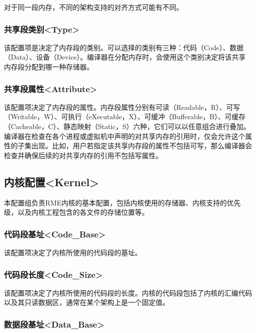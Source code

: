 对于同一段内存，不同的架构支持的对齐方式可能有不同。

\subsubsection{共享段类别<Type>{}}\label{subsubsec:5-3-11-5}

该配置项是决定了内存段的类别。可以选择的类别有三种：代码（Code）、数据（Data）、设备（Device）。编译器在分配内存时，会使用这个类别决定将该共享内存段分配到哪一种存储器。

\subsubsection{共享段属性<Attribute>{}}\label{subsubsec:5-3-11-6}

该配置项决定了内存段的属性。内存段属性分别有可读（Readable，R）、可写（Writable，W）、可执行（eXecutable，X）、可缓冲（Bufferable，B）、可缓存（Cacheable，C）、静态映射（Static，S）六种，它们可以以任意组合进行叠加。编译器在检查在各个进程或虚拟机中声明的对共享内存的引用时，仅会允许这个属性的子集出现。比如，用户若指定该共享内存段的属性不包括可写，那么编译器会检查并确保后续的对共享内存的引用不包括写属性。

\subsection{内核配置<Kernel>{}}\label{subsec:5-3-12}

本配置组负责RME内核的基本配置，包括内核使用的存储器、内核支持的优先级，以及内核工程包含的各文件的存储位置等。

\subsubsection{代码段基址<Code\_Base>{}}\label{subsubsec:5-3-12-1}

该配置项决定了内核所使用的代码段的基址。

\subsubsection{代码段长度<Code\_Size>{}}\label{subsubsec:5-3-12-2}

该配置项决定了内核所使用的代码段的长度。内核的代码段包括了内核的汇编代码以及其只读数据区，通常在某个架构上是一个固定值。

\subsubsection{数据段基址<Data\_Base>{}}\label{subsubsec:5-3-12-3}

